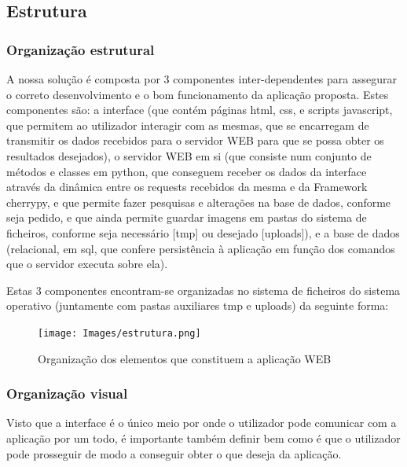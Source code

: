 \documentclass{report}
\begin{document}
\subsection{Estrutura}

\subsubsection{Organização estrutural}

A nossa solução é composta por 3 componentes inter-dependentes para assegurar o correto desenvolvimento e o bom funcionamento da aplicação proposta. Estes componentes são: a interface (que contém páginas html, css, e scripts javascript, que permitem ao utilizador interagir com as mesmas, que se encarregam de transmitir os dados recebidos para o servidor WEB para que se possa obter os resultados desejados), o servidor WEB em si (que consiste num conjunto de métodos e classes em python, que conseguem receber os dados da interface através da dinâmica entre os requests recebidos da mesma e da Framework cherrypy, e que permite fazer pesquisas e alterações na base de dados, conforme seja pedido, e que ainda permite guardar imagens em pastas do sistema de ficheiros, conforme seja necessário [tmp] ou desejado [uploads]), e a base de dados (relacional, em sql, que confere persistência à aplicação em função dos comandos que o servidor executa sobre ela).

\linebreak
\bigskip
    
	Estas 3 componentes encontram-se organizadas no sistema de ficheiros do sistema operativo (juntamente com pastas auxiliares tmp e uploads) da seguinte forma:

\begin{figure}[!hbtp]
        \centering 
        \texttt{[image: Images/estrutura.png]}
        \caption{\label{Estrutura}Organização dos elementos que constituem a aplicação WEB}
    \end{figure}

\newpage
\subsubsection{Organização visual}


Visto que a interface é o único meio por onde o utilizador pode comunicar com a aplicação por um todo, é importante também definir bem como é que o utilizador pode prosseguir de modo a conseguir obter o que deseja da aplicação.
\linebreak
  
\end{document}
